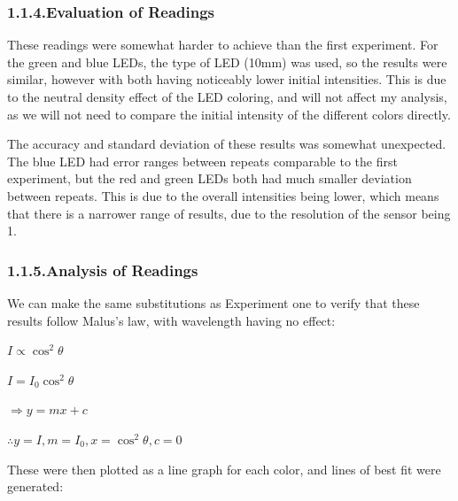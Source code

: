 \documentclass{article}
\begin{document}
\subsubsection{1.1.4.\hspace*{0.5em}Evaluation of Readings}\label{sec-evaluation-of-readings}%

\noindent{}These readings were somewhat harder to achieve than the first experiment. For the green and blue LEDs, the type of LED (10mm) was used, so the results were similar, however with both having noticeably lower initial intensities. This is due to the neutral density effect of the LED coloring, and will not affect my analysis, as we will not need to compare the initial intensity of the different colors directly.%

The accuracy and standard deviation of these results was somewhat unexpected. The blue LED had error ranges between repeats comparable to the first experiment, but the red and green LEDs both had much smaller deviation between repeats. This is due to the overall intensities being lower, which means that there is a narrower range of results, due to the resolution of the sensor being 1.%

\subsubsection{1.1.5.\hspace*{0.5em}Analysis of Readings}\label{sec-analysis-of-readings}%

\noindent{}We can make the same substitutions as Experiment one to verify that these results follow Malus's law, with wavelength having no effect:%

$I\propto\cos^2\theta$%

$I=I_0\cos^2\theta$%

$\Rightarrow y=mx+c$%

$\therefore y=I, m=I_0, x=\cos^2\theta, c=0$%

These were then plotted as a line graph for each color, and lines of best fit were generated:%
\end{document}
